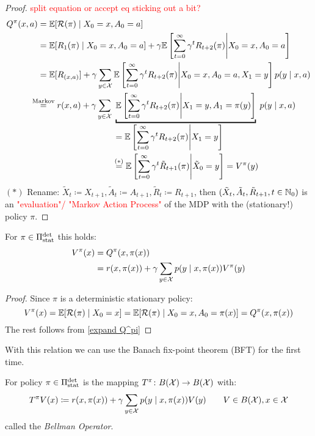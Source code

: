 \begin{proof} \textcolor{red}{split equation or accept eq sticking out a bit?}
\begin{align*}
Q^\pi(x,a) &= \E[\cR(\pi)\mid X_0=x, A_0=a]\\
&=\E[R_1(\pi)\mid X_0=x,A_0=a]+\gamma\E\left[\sum_{t=0}^\infty\gamma^t R_{t+2}(\pi)\middle| X_0=x,A_0=a\right]\\
&=\E[R_{(x,a)}] 
 + \gamma \sum_{y\in\cX}\E\left[\sum_{t=0}^\infty\gamma^t R_{t+2}(\pi) \middle| X_0=x,A_0=a, X_1=y\right]p(y\mid x, a)\\
&\lxeq{\text{Markov}} r(x,a)
 + \gamma\sum_{y\in\cX}\underbracket{\E\left[\sum_{t=0}^\infty\gamma^t R_{t+2}(\pi)\middle| X_1=y, A_1=\pi(y)\right]}_{
 \begin{aligned}
 	&= \E\left[\sum_{t=0}^\infty\gamma^t R_{t+2}(\pi)\middle| X_1=y \right] \\
 	&\lxeq{(*)} \E\left[\sum_{t=0}^\infty\gamma^t \tilde{R}_{t+1}(\pi)\middle| \tilde{X}_0=y \right]=V^\pi(y)
 \end{aligned}
 }
 p(y\mid x, a)
\end{align*}
\((*)\) Rename: \(\tilde{X}_{t}\coloneqq X_{t+1}, \tilde{A}_t\coloneqq A_{t+1},\tilde{R}_{t}\coloneqq R_{t+1}\), then \((\tilde{X}_t,\tilde{A}_t,\tilde{R}_{t+1}, t\in\mathbb{N}_0)\) is an \textcolor{red}{"evaluation"/ "Markov Action Process"} of the MDP with the (stationary!) policy \(\pi\).
\end{proof}

\begin{corollary}\label{V^pi,Q^pi relation} For \(\pi\in\Pi_{\textnormal{stat}}^{\textnormal{det}}\) this holds: 
\begin{align*}
	V^\pi(x)&=Q^\pi(x,\pi(x))\\
	 &=r(x,\pi(x))+\gamma\sum\limits_{y\in\mathcal{X}}p(y\mid x,\pi(x))V^\pi(y) 
\end{align*}
\end{corollary}

\begin{proof}
Since \(\pi\) is a deterministic stationary policy:
\[V^\pi(x)=\mathbb{E}[\mathcal{R}(\pi)\mid X_0=x]=\mathbb{E}[\mathcal{R}(\pi)\mid X_0=x, A_0=\pi(x)]=Q^\pi(x,\pi(x))\]
The rest follows from \ref{expand Q^pi}
\end{proof}

With this relation we can use the Banach fix-point theorem (BFT) for the first time.

\begin{definition} For policy \(\pi\in\Pi_{\textnormal{stat}}^{\textnormal{det}}\) is the mapping \(T^\pi\colon B(\mathcal{X})\to B(\mathcal{X})\) with:
	\[
	T^\pi V(x)\coloneqq r(x,\pi(x))+\gamma\sum_{y\in\mathcal{X}}p(y\mid x,\pi(x)) V(y)\qquad V\in B(\mathcal{X}), x\in\mathcal{X}
	\]
called the \emph{Bellman Operator}.
\end{definition}


